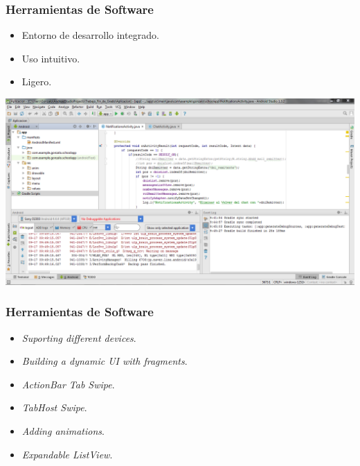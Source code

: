 \begin{frame}
	\frametitle{Herramientas de Software}
		\begin{itemize}
			\item Entorno de desarrollo integrado.
			\item Uso intuitivo.
			\item Ligero.
		\end{itemize}
	\endblock{}
	\vfill 
	\begin{center}
		\includegraphics[width=0.8\linewidth]{Images/AndroidStudio}
	\end{center}
\end{frame}

\begin{frame}
	\frametitle{Herramientas de Software}
		\begin{itemize}
			\item {\it Suporting different devices}.
			\item {\it Building a dynamic UI with fragments}.
			\item {\it ActionBar Tab Swipe}.
			\item {\it TabHost Swipe}.
			\item {\it Adding animations}.
			\item {\it Expandable ListView}.
		\end{itemize}
	\endblock{}
\end{frame}


